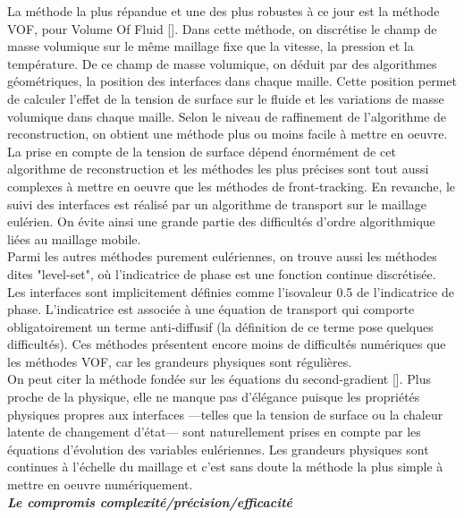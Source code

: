La m\'ethode la plus r\'epandue et une des plus robustes \`a ce jour est la m\'ethode VOF, pour Volume Of Fluid [\cite{Hirt1981}]. Dans cette m\'ethode, on discr\'etise le champ de masse volumique sur le m\^eme maillage fixe que la vitesse, la pression et la temp\'erature. De ce champ de masse volumique, on d\'eduit par des algorithmes g\'eom\'etriques, la position des interfaces dans chaque maille. Cette position permet de calculer l’effet de la tension de surface sur le fluide et les variations de masse volumique dans chaque maille. Selon le niveau de raffinement de l’algorithme de reconstruction, on obtient une m\'ethode plus ou moins facile à mettre en oeuvre. La prise en compte de la tension de surface d\'epend \'enorm\'ement de cet algorithme de reconstruction et les m\'ethodes les plus pr\'ecises sont tout aussi complexes à mettre en oeuvre que les m\'ethodes de front-tracking. En revanche, le suivi des interfaces est r\'ealis\'e par un algorithme de transport sur le maillage eul\'erien. On \'evite ainsi une grande partie des difficult\'es d’ordre algorithmique li\'ees au maillage mobile.\\
Parmi les autres m\'ethodes purement eul\'eriennes, on trouve aussi les m\'ethodes dites "level-set", où l’indicatrice de phase est une fonction continue discr\'etis\'ee. Les interfaces sont implicitement d\'efinies comme l’isovaleur 0.5 de l’indicatrice de phase. L’indicatrice est associ\'ee à une \'equation de transport qui comporte obligatoirement un terme anti-diffusif (la d\'efinition de ce terme pose quelques difficult\'es). Ces m\'ethodes pr\'esentent encore moins de difficult\'es num\'eriques que les m\'ethodes VOF, car les grandeurs physiques sont r\'eguli\`eres.\\
On peut citer la m\'ethode fond\'ee sur les \'equations du second-gradient [\cite{Jamet2001}].
Plus proche de la physique, elle ne manque pas d’\'el\'egance puisque les propri\'et\'es physiques propres aux interfaces —telles que la tension de surface ou la chaleur latente de changement d’\'etat— sont naturellement prises en compte par les \'equations d’\'evolution des variables eul\'eriennes. Les grandeurs physiques sont continues \`a l’\'echelle du maillage et c’est sans doute la m\'ethode la plus simple à mettre en oeuvre num\'eriquement.\smallskip \\

\textit{\textbf{Le compromis complexit\'e/pr\'ecision/efficacit\'e}}\smallskip \\

